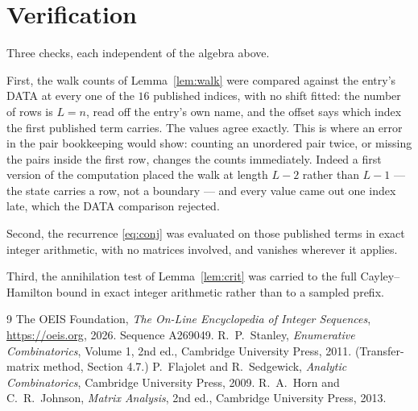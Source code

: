 \documentclass[11pt,a4paper]{article}
\theoremstyle{plain}
\theoremstyle{definition}
\begin{document}
\section{Verification}

Three checks, each independent of the algebra above.

First, the walk counts of Lemma~\ref{lem:walk} were compared against the entry's DATA at
every one of the $16$ published indices, with no shift fitted: the number of rows is
$L=n$, read off the entry's own name, and the offset says which index the first
published term carries. The values agree exactly. This is where an error in the pair
bookkeeping would show: counting an unordered pair twice, or missing the pairs inside the
first row, changes the counts immediately. Indeed a first version of the computation
placed the walk at length $L-2$ rather than $L-1$ --- the state carries a row, not a
boundary --- and every value came out one index late, which the DATA comparison rejected.

Second, the recurrence \eqref{eq:conj} was evaluated on those published terms in exact
integer arithmetic, with no matrices involved, and vanishes wherever it applies.

Third, the annihilation test of Lemma~\ref{lem:crit} was carried to the full
Cayley--Hamilton bound in exact integer arithmetic rather than to a sampled prefix.

\begin{thebibliography}{9}
 The OEIS Foundation, \emph{The On-Line Encyclopedia of Integer
Sequences}, \url{https://oeis.org}, 2026. Sequence A269049.
 R.~P.~Stanley, \emph{Enumerative Combinatorics}, Volume 1, 2nd ed.,
Cambridge University Press, 2011. (Transfer-matrix method, Section 4.7.)
 P.~Flajolet and R.~Sedgewick, \emph{Analytic Combinatorics}, Cambridge
University Press, 2009.
 R.~A.~Horn and C.~R.~Johnson, \emph{Matrix Analysis}, 2nd ed., Cambridge
University Press, 2013.
\end{thebibliography}
\end{document}
